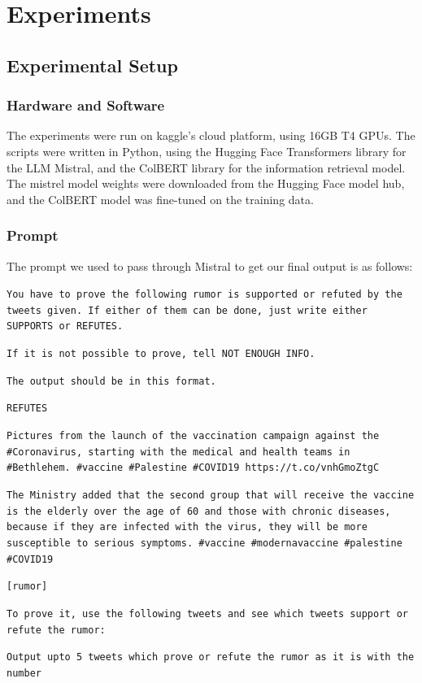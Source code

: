 \documentclass[conference]{IEEEtran}
\begin{document}
\section{Experiments}

\subsection{Experimental Setup}
\subsubsection{Hardware and Software}
The experiments were run on kaggle's cloud platform, using 16GB T4 GPUs. The scripts were written in Python, using the Hugging Face Transformers library for the LLM Mistral, and the ColBERT library for the information retrieval model. The mistrel model weights were downloaded from the Hugging Face model hub, and the ColBERT model was fine-tuned on the training data.\\

\subsubsection{Prompt}
The prompt we used to pass through Mistral to get our final output is as follows:

\texttt{You have to prove the following rumor is supported or refuted by the tweets given. If either of them can be done, just write either SUPPORTS or REFUTES.}

\texttt{If it is not possible to prove, tell NOT ENOUGH INFO.}

\texttt{The output should be in this format. }

\texttt{REFUTES}

\texttt{Pictures from the launch of the vaccination campaign against the \#Coronavirus, starting with the medical and health teams in \#Bethlehem. \#vaccine \#Palestine \#COVID19 https://t.co/vnhGmoZtgC}

\texttt{The Ministry added that the second group that will receive the vaccine is the elderly over the age of 60 and those with chronic diseases, because if they are infected with the virus, they will be more susceptible to serious symptoms. \#vaccine \#modernavaccine \#palestine \#COVID19}

\texttt{[rumor]}

\texttt{To prove it, use the following tweets and see which tweets support or refute the rumor:}

\texttt{Output upto 5 tweets which prove or refute the rumor as it is with the number}
\end{document}
